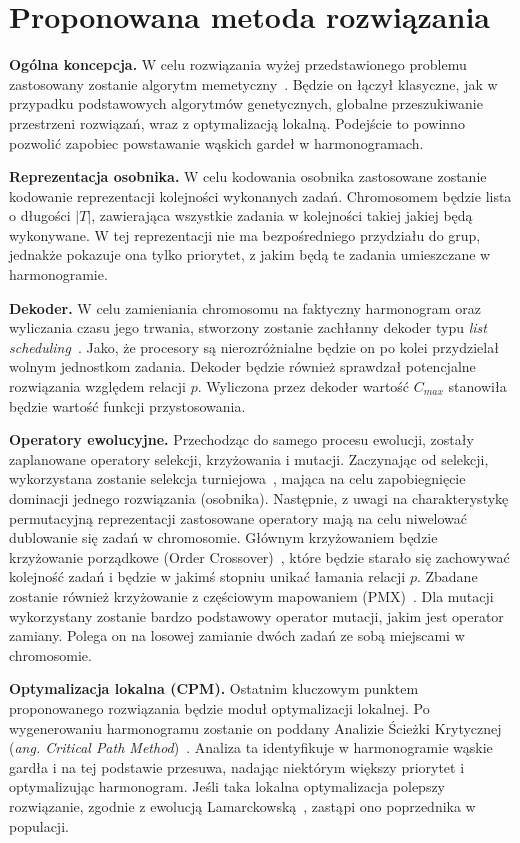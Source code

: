 \documentclass[12pt,a4paper]{article}
\begin{document}
\section{Proponowana metoda rozwiązania}
\textbf{Ogólna koncepcja.} W celu rozwiązania wyżej przedstawionego problemu zastosowany zostanie algorytm memetyczny~\cite{moscato1989}. Będzie on łączył klasyczne, jak w przypadku podstawowych algorytmów genetycznych, globalne przeszukiwanie przestrzeni rozwiązań, wraz z optymalizacją lokalną. Podejście to powinno pozwolić zapobiec powstawanie wąskich gardeł w harmonogramach.
\par\medskip\noindent
\textbf{Reprezentacja osobnika.} W celu kodowania osobnika zastosowane zostanie kodowanie reprezentacji kolejności wykonanych zadań. Chromosomem będzie lista o długości $|T|$, zawierająca wszystkie zadania w kolejności takiej jakiej będą wykonywane. W tej reprezentacji nie ma bezpośredniego przydziału do grup, jednakże pokazuje ona tylko priorytet, z jakim będą te zadania umieszczane w harmonogramie.
\par\medskip\noindent
\textbf{Dekoder.} W celu zamieniania chromosomu na faktyczny harmonogram oraz wyliczania czasu jego trwania, stworzony zostanie zachłanny dekoder typu \textit{list scheduling}~\cite{graham1969}. Jako, że procesory są nierozróżnialne będzie on po kolei przydzielał wolnym jednostkom zadania. Dekoder będzie również sprawdzał potencjalne rozwiązania względem relacji $p$. Wyliczona przez dekoder wartość $C_{max}$ stanowiła będzie wartość funkcji przystosowania.
\par\medskip\noindent
\textbf{Operatory ewolucyjne.} Przechodząc do samego procesu ewolucji, zostały zaplanowane operatory selekcji, krzyżowania i mutacji. Zaczynając od selekcji, wykorzystana zostanie selekcja turniejowa~\cite{miller1995}, mająca na celu zapobiegnięcie dominacji jednego rozwiązania (osobnika). Następnie, z uwagi na charakterystykę permutacyjną reprezentacji zastosowane operatory mają na celu niwelować dublowanie się zadań w chromosomie. Głównym krzyżowaniem będzie krzyżowanie porządkowe (Order Crossover)~\cite{davis1985}, które będzie starało się zachowywać kolejność zadań i będzie w jakimś stopniu unikać łamania relacji $p$. Zbadane zostanie również krzyżowanie z częściowym mapowaniem (PMX)~\cite{goldberg1985}. Dla mutacji wykorzystany zostanie bardzo podstawowy operator mutacji, jakim jest operator zamiany. Polega on na losowej zamianie dwóch zadań ze sobą miejscami w chromosomie.
\par\medskip\noindent
\textbf{Optymalizacja lokalna (CPM).} Ostatnim kluczowym punktem proponowanego rozwiązania będzie moduł optymalizacji lokalnej. Po wygenerowaniu harmonogramu zostanie on poddany Analizie Ścieżki Krytycznej (\textit{ang. Critical Path Method})~\cite{kelley1959}. Analiza ta identyfikuje w harmonogramie wąskie gardła i na tej podstawie przesuwa, nadając niektórym większy priorytet i optymalizując harmonogram. Jeśli taka lokalna optymalizacja polepszy rozwiązanie, zgodnie z ewolucją Lamarckowską~\cite{whitley1994}, zastąpi ono poprzednika w populacji.
\end{document}
